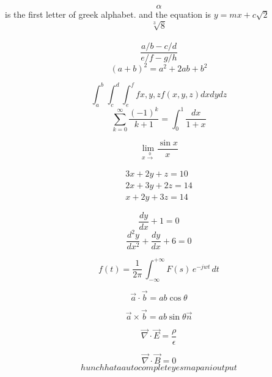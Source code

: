 \documentclass[12pt]{article}
\begin{document}
$$\alpha$$ is the first letter of greek alphabet. and the equation is $y = mx + c$$\sqrt{2}$ \\
$$\sqrt[3]{8}$$\\
$$\frac{a/b-c/d}{e/f-g/h}$$
$$(a+b)^2 = a^2+2ab+b^2$$

$$\int_{a}^{b}\int_{c}^{d}\int_{e}^{f}f{x,y,z}f(x,y,z) dxdydz$$
$$\sum_{k=0}^\infty\frac{(-1)^k}{k+1} = \int_0^1\frac{dx}{1+x}$$

$$\lim_{x\xrightarrow0}\frac{\sin x}{x}$$

\begin{align*}
  3x+2y+z = 10 \\ 
  2x+3y+2z = 14 \\ 
  x+2y+3z = 14
\end{align*}

$$\frac{dy}{dx} + 1 = 0$$
$$\frac{d^2y}{dx^2}+\frac{dy}{dx} + 6 = 0$$

$$f(t)=\frac{1}{2\pi}\,\int_{-\infty}^{+\infty} F(s)\,e^{-jwt}\,dt$$

$$\overset{\rightarrow}{a} \cdot \overset{\rightarrow}{b} = ab\cos \theta $$

$$\overrightarrow{a} \times \overrightarrow{b}= ab\sin{\theta}\overrightarrow{n}$$

$$ \overrightarrow{\nabla}\cdot\overrightarrow{E} = \frac{\rho}{\epsilon} $$

$$ \overrightarrow{\nabla}\cdot\overrightarrow{B} = 0 $$
\begin{equation}
hunchha ta autocomplete yesma pani
output 
\end{equation}
\end{document}
